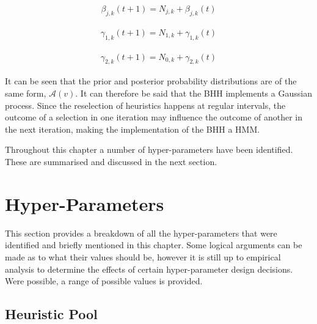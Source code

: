 \begin{equation}
      \label{eq:bhh:optimisation_step:map:beta_update_operation}
      \begin{split}
            \beta_{j,k}(t+1) = N_{j,k} + \beta_{j,k}(t)
      \end{split}
\end{equation}

\begin{equation}
      \label{eq:bhh:optimisation_step:map:gamma1_update_operation}
      \begin{split}
            \gamma_{1,k}(t+1) = N_{1,k} + \gamma_{1,k}(t)
      \end{split}
\end{equation}

\begin{equation}
      \label{eq:bhh:optimisation_step:map:gamma2_update_operation}
      \begin{split}
            \gamma_{2,k}(t+1) = N_{0,k} + \gamma_{2,k}(t)
      \end{split}
\end{equation}

It can be seen that the prior and posterior probability distributions are of the same form, $\mathcal{A}(v)$. It can therefore be said that the \acs{BHH} implements a Gaussian process. Since the reselection of heuristics happens at regular intervals, the outcome of a selection in one iteration may influence the outcome of another in the next iteration, making the implementation of the \acs{BHH} a \acf{HMM}.

Throughout this chapter a number of hyper-parameters have been identified. These are summarised and discussed in the next section.


\section{Hyper-Parameters}\label{sec:bhh:hyper_parameters}

This section provides a breakdown of all the hyper-parameters that were identified and briefly mentioned in this chapter. Some logical arguments can be made as to what their values should be, however it is still up to empirical analysis to determine the effects of certain hyper-parameter design decisions. Were possible, a range of possible values is provided.

\subsection{Heuristic Pool}\label{sec:bhh:hyper_parameters:heuristic_pool}

